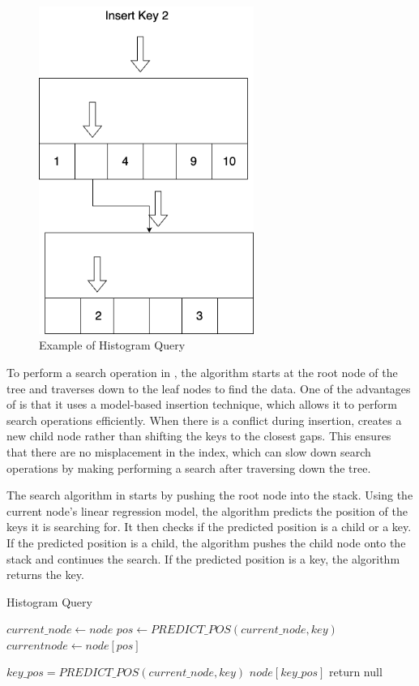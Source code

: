 \begin{figure}[H]
    \centering
    \includegraphics[width=70mm,scale=1]{Figures/QueryHist.png}
    \caption{
     Example of Histogram Query
    }
    \label{fig:HistQueryExample}
\end{figure}
To perform a search operation in \learnindex, the algorithm starts at the root node of the tree and traverses down to the leaf nodes to find the data. One of the advantages of \learnindex is that it uses a model-based insertion technique, which allows it to perform search operations efficiently. When there is a conflict during insertion, \learnindex creates a new child node rather than shifting the keys to the closest gaps. This ensures that there are no misplacement in the index, which can slow down search operations by making performing a search after traversing down the tree.

The search algorithm in \learnindex starts by pushing the root node into the stack. Using the current node's linear regression model, the algorithm predicts the position of the keys it is searching for. It then checks if the predicted position is a child or a key. If the predicted position is a child, the algorithm pushes the child node onto the stack and continues the search. If the predicted position is a key, the algorithm returns the key.
\begin{algorithm}
\caption{Histogram Query}
\begin{algorithmic}[1]
\State $current\_node \gets node$
\State $pos \gets PREDICT\_POS(current\_node, key)$
    \State $current node \gets node[pos]$
    
\Else
    \State $key\_pos = PREDICT\_POS(current\_node, key)$
    \State \Return $node[key\_pos]$
\EndIf
\EndWhile
\State return null
\EndProcedure
\end{algorithmic}
\end{algorithm}


